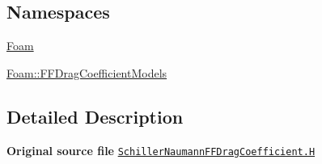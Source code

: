 \subsection*{Namespaces}
\begin{DoxyCompactItemize}
\item 
 \hyperlink{namespaceFoam}{Foam}
\item 
 \hyperlink{namespaceFoam_1_1FFDragCoefficientModels}{Foam\+::\+F\+F\+Drag\+Coefficient\+Models}
\end{DoxyCompactItemize}


\subsection{Detailed Description}
{\bfseries Original source file} \href{../../../home/carlo/data/GeN-Foam/GeN-Foam_ffn/GeN-Foam/GeN-Foam/classes/thermalHydraulics/src/physicsModels/dragModels/FFDragCoefficientModels/SchillerNaumann/SchillerNaumannFFDragCoefficient.H}{\tt Schiller\+Naumann\+F\+F\+Drag\+Coefficient.\+H} 